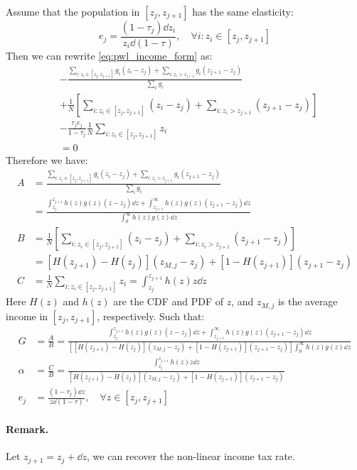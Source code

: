 Assume that the population in $[z_j,z_{j+1}]$ has the same elasticity:
\begin{equation*}
    e_j = \frac{(1-\tau_j)\dd z_i}{z_i\dd(1-\tau)}, \quad \forall i: z_i \in [z_j,z_{j+1}]
\end{equation*}
Then we can rewrite \eqref{eq:pwl_income_form} as:
\begin{align*} 
    &-\frac{\sum_{i:z_i \in [z_j,z_{j+1}]}g_i(z_i-z_j) + \sum_{i:z_i > z_{j+1}}g_i(z_{j+1}-z_j)}{\sum_i g_i} \\
    &+ \frac{1}{N}\left [\sum_{i:z_i \in [z_j,z_{j+1}]}(z_i-z_j) + \sum_{i:z_i > z_{j+1}}(z_{j+1}-z_j)\right ] \\
    &- \frac{\tau_j e_j}{1-\tau_j}\frac{1}{N}\sum_{i:z_i \in [z_j,z_{j+1}]} z_i \\
    &= 0
\end{align*}
Therefore we have:
\begin{align*}
    A &= \frac{\sum_{i:z_i \in [z_j,z_{j+1}]}g_i(z_i-z_j) + \sum_{i:z_i > z_{j+1}}g_i(z_{j+1}-z_j)}{\sum_i g_i} \\
        &= \frac{\int_{z_j}^{z_{j+1}}h(z)g(z)(z-z_j)\dd z + \int_{z_{j+1}}^{\infty}h(z)g(z)(z_{j+1}-z_j)\dd z}{\int_0^\infty h(z)g(z)\dd z} \\
    B &= \frac{1}{N}\left [\sum_{i:z_i \in [z_j,z_{j+1}]}(z_i-z_j) + \sum_{i:z_i > z_{j+1}}(z_{j+1}-z_j)\right ] \\
        &= [H(z_{j+1})-H(z_j)](z_{M,j}-z_j) + [1-H(z_{j+1})](z_{j+1}-z_j) \\
    C &= \frac{1}{N}\sum_{i:z_i \in [z_j,z_{j+1}]} z_i = \int_{z_j}^{z_{j+1}}h(z)z\dd z
\end{align*}
Here $H(z)$ and $h(z)$ are the CDF and PDF of $z$, and $z_{M,j}$ is the average income in $[z_j,z_{j+1}]$, respectively.
Such that:
\begin{align*}
    G &= \frac{A}{B} = \frac{\int_{z_j}^{z_{j+1}}h(z)g(z)(z-z_j)\dd z + \int_{z_{j+1}}^{\infty}h(z)g(z)(z_{j+1}-z_j)\dd z}{\left [[H(z_{j+1})-H(z_j)](z_{M,j}-z_j) + [1-H(z_{j+1})](z_{j+1}-z_j)\right ]\int_0^\infty h(z)g(z)\dd z} \\
    \alpha &= \frac{C}{B} = \frac{\int_{z_j}^{z_{j+1}}h(z)z\dd z}{[H(z_{j+1})-H(z_j)](z_{M,j}-z_j) + [1-H(z_{j+1})](z_{j+1}-z_j)} \\
    e_{j} &= \frac{(1-\tau_j)\dd z}{z\dd(1-\tau)}, \quad \forall z \in [z_j,z_{j+1}]
\end{align*}

\paragraph{Remark.} Let $z_{j+1}=z_j+\dd z$, we can recover the non-linear income tax rate.

